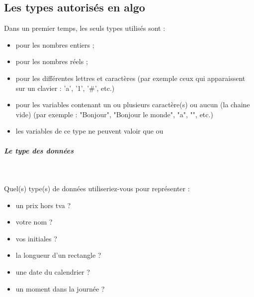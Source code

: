 \documentclass[11pt,a4paper]{article}
\begin{document}
            \par
        \subsection{Les types autoris\'es en algo}
          Dans un premier temps, les seuls types utilis\'es sont :
          
					\begin{itemize}
				
			\item \verb@entier@ pour les nombres entiers ;
			\item {} pour les nombres r\'eels ;
			\item {} pour les diff\'erentes lettres et caract\`eres
              (par exemple ceux qui apparaissent sur un clavier : 'a', '1', '\#', etc.)
			\item \verb@chaine@ pour les variables contenant un ou plusieurs caract\`ere(s) ou aucun (la chaine vide)
              (par exemple : "Bonjour", "Bonjour le monde", "a", "", etc.)
			\item {} les variables de ce type 
            ne peuvent valoir que \verb@vrai@ ou \verb@faux@
					\end{itemize}
				
            \par
        
			
		\subparagraph{Le type des donn\'ees} 
		
                \textcolor{white}{.} \par
             
								Quel(s) type(s) de donn\'ees utiliseriez-vous pour repr\'esenter :
							
					\begin{itemize}
				
			\item un prix hors tva ? \textcolor{gray}{\underline{\hspace*{3em}}} 
			\item votre nom ?  \textcolor{gray}{\underline{\hspace*{5em}}} 
			\item vos initiales ? \textcolor{gray}{\underline{\hspace*{10em}}} 
			\item la longueur d'un rectangle ?  \textcolor{gray}{\underline{\hspace*{3em}}} 
			\item une date du calendrier ?  \textcolor{gray}{\underline{\hspace*{10em}}} 
			\item un moment dans la journ\'ee ?  \textcolor{gray}{\underline{\hspace*{10em}}} 
					\end{itemize}
\end{document}
